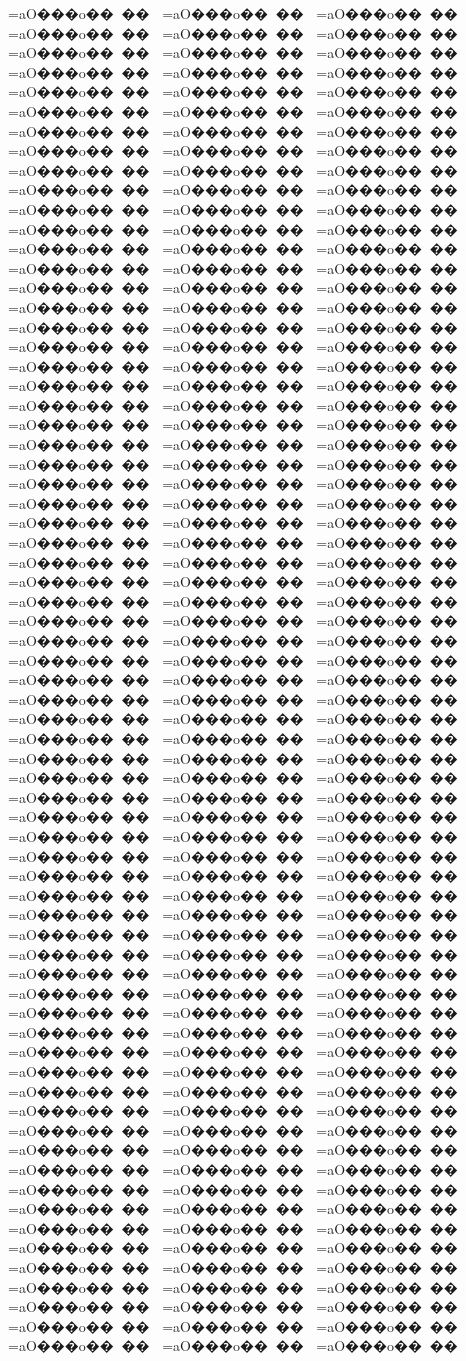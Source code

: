 {{{{{{{{{{{{{{{{{ =aO���o���� =aO���o���� =aO���o���� =aO���o���� =aO���o���� =aO���o���� =aO���o���� =aO���o���� =aO���o���� =aO���o���� =aO���o���� =aO���o���� =aO���o���� =aO���o���� =aO���o���� =aO���o���� =aO���o���� =aO���o���� =aO���o���� =aO���o���� =aO���o���� =aO���o���� =aO���o���� =aO���o���� =aO���o���� =aO���o���� =aO���o���� =aO���o���� =aO���o���� =aO���o���� =aO���o���� =aO���o���� =aO���o���� =aO���o���� =aO���o���� =aO���o���� =aO���o���� =aO���o���� =aO���o���� =aO���o���� =aO���o���� =aO���o���� =aO���o���� =aO���o���� =aO���o���� =aO���o���� =aO���o���� =aO���o���� =aO���o���� =aO���o���� =aO���o���� =aO���o���� =aO���o���� =aO���o���� =aO���o���� =aO���o���� =aO���o���� =aO���o���� =aO���o���� =aO���o���� =aO���o���� =aO���o���� =aO���o���� =aO���o���� =aO���o���� =aO���o���� =aO���o���� =aO���o���� =aO���o���� =aO���o���� =aO���o���� =aO���o���� =aO���o���� =aO���o���� =aO���o���� =aO���o���� =aO���o���� =aO���o���� =aO���o���� =aO���o���� =aO���o���� =aO���o���� =aO���o���� =aO���o���� =aO���o���� =aO���o���� =aO���o���� =aO���o���� =aO���o���� =aO���o���� =aO���o���� =aO���o���� =aO���o���� =aO���o���� =aO���o���� =aO���o���� =aO���o���� =aO���o���� =aO���o���� =aO���o���� =aO���o���� =aO���o���� =aO���o���� =aO���o���� =aO���o���� =aO���o���� =aO���o���� =aO���o���� =aO���o���� =aO���o���� =aO���o���� =aO���o���� =aO���o���� =aO���o���� =aO���o���� =aO���o���� =aO���o���� =aO���o���� =aO���o���� =aO���o���� =aO���o���� =aO���o���� =aO���o���� =aO���o���� =aO���o���� =aO���o���� =aO���o���� =aO���o���� =aO���o���� =aO���o���� =aO���o���� =aO���o���� =aO���o���� =aO���o���� =aO���o���� =aO���o���� =aO���o���� =aO���o���� =aO���o���� =aO���o���� =aO���o���� =aO���o���� =aO���o���� =aO���o���� =aO���o���� =aO���o���� =aO���o���� =aO���o���� =aO���o���� =aO���o���� =aO���o���� =aO���o���� =aO���o���� =aO���o���� =aO���o���� =aO���o���� =aO���o���� =aO���o���� =aO���o���� =aO���o���� =aO���o���� =aO���o���� =aO���o���� =aO���o���� =aO���o���� =aO���o���� =aO���o���� =aO���o���� =aO���o���� =aO���o���� =aO���o���� =aO���o���� =aO���o���� =aO���o���� =aO���o���� =aO���o���� =aO���o���� =aO���o���� =aO���o���� =aO���o���� =aO���o���� =aO���o���� =aO���o���� =aO���o���� =aO���o���� =aO���o���� =aO���o���� =aO���o���� =aO���o���� =aO���o���� =aO���o���� =aO���o���� =aO���o���� =aO���o���� =aO���o���� =aO���o���� =aO���o���� =aO���o���� =aO���o���� =aO���o���� =aO���o���� =aO���o���� =aO���o���� =aO���o���� =aO���o���� =aO���o���� =aO���o���� }}}}}}}}}}}}}}}}}
